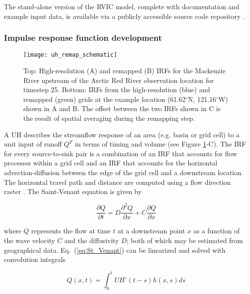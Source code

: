 The stand-alone version of the RVIC model, complete with documentation and example input data, is available via a publicly accessible source code repository \citep{Hamman_2015}.

\subsubsection{Impulse response function development}
\label{sec:irfs}

\begin{figure}
    \centering
    \texttt{[image: uh\_remap\_schematic]}
    \caption{Top: High-resolution (A) and remapped (B) IRFs for the Mackenzie River upstream of the Arctic Red River observation location for timestep 25.
    Bottom: IRFs from the high-resolution (blue) and remapped (green) grids at the example location (61.62$^\circ$N, 121.16$^\circ$W) shown in A and B.
    The offset between the two IRFs shown in C is the result of spatial averaging during the remapping step.}
    \label{fig:uh_remap_schematic}
\end{figure}

A UH describes the streamflow response of an area (e.g. basin or grid cell) to a unit input of runoff $Q^F$ in terms of timing and volume (see Figure \ref{fig:uh_remap_schematic}-C).
The IRF for every source-to-sink pair is a combination of an IRF that accounts for flow processes within a grid cell and an IRF that accounts for the horizontal advection-diffusion between the edge of the grid cell and a downstream location.
The horizontal travel path and distance are computed using a flow direction raster \citep[e.g.][]{Wu_2011}.
The Saint-Venant equation is given by

 \begin{equation}
   \label{eq:St_Venant}
   \frac{\partial Q}{\partial t} = D \frac{\partial^2 Q}{\partial x} + C \frac{\partial Q}{\partial x}
 \end{equation}

where $Q$ represents the flow at time $t$ at a downstream point $x$ as a function of the wave velocity $C$ and the diffusivity $D$; both of which may be estimated from geographical data.
Eq.~(\ref{eq:St_Venant}) can be linearized and solved with convolution integrals

 \begin{equation}
   \label{eq:conv_integral}
	  Q(x,t) = \int_0^t UH^{\circ}(t-s)h(x,s)ds
 \end{equation}

